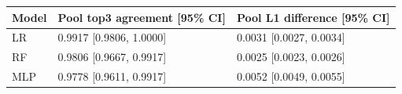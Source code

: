 \begingroup\footnotesize\setlength{\tabcolsep}{3pt}
\begin{tabular}{lll}
\toprule
Model & Pool top3 agreement [95\% CI] & Pool L1 difference [95\% CI] \\
\midrule
LR & 0.9917 [0.9806, 1.0000] & 0.0031 [0.0027, 0.0034] \\
RF & 0.9806 [0.9667, 0.9917] & 0.0025 [0.0023, 0.0026] \\
MLP & 0.9778 [0.9611, 0.9917] & 0.0052 [0.0049, 0.0055] \\
\bottomrule
\end{tabular}
\endgroup
